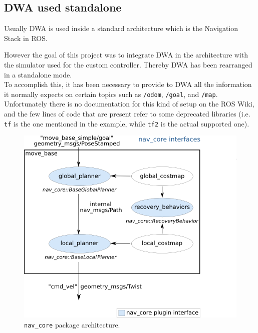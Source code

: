 \documentclass[11pt,a4paper]{article}
\begin{document}

\subsection{DWA used standalone}

Usually DWA is used inside a standard architecture which is the Navigation Stack in ROS.

However the goal of this project was to integrate DWA in the architecture with the simulator used for
the custom controller. Thereby DWA has been rearranged in a standalone mode.\\

To accomplish this, it has been necessary to provide to DWA all the information it normally expects on certain topics such as \texttt{/odom}, \texttt{/goal}, and \texttt{/map}.\\

Unfortunately there is no documentation for this kind of setup on the ROS Wiki, and the few lines of code that are present
refer to some deprecated libraries (i.e. \texttt{tf} is the one mentioned in the example, while \texttt{tf2} is the actual
supported one).

\begin{figure}[H]
    \centering
    \includegraphics[scale=0.6]{other/nav_core.png}
    \caption{\texttt{nav\_core} package architecture.}
\end{figure}
\end{document}
